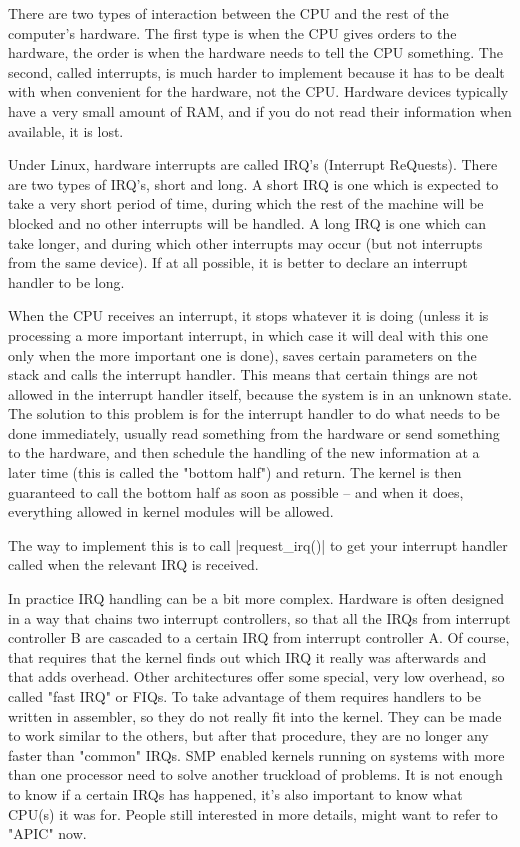 \documentclass[10pt, oneside]{book}
\begin{document}
There are two types of interaction between the CPU and the rest of the computer's hardware.
The first type is when the CPU gives orders to the hardware, the order is when the hardware needs to tell the CPU something.
The second, called interrupts, is much harder to implement because it has to be dealt with when convenient for the hardware, not the CPU.
Hardware devices typically have a very small amount of RAM, and if you do not read their information when available, it is lost.

Under Linux, hardware interrupts are called IRQ's (Interrupt ReQuests).
There are two types of IRQ's, short and long.
A short IRQ is one which is expected to take a very short period of time, during which the rest of the machine will be blocked and no other interrupts will be handled.
A long IRQ is one which can take longer, and during which other interrupts may occur (but not interrupts from the same device).
If at all possible, it is better to declare an interrupt handler to be long.

When the CPU receives an interrupt, it stops whatever it is doing (unless it is processing a more important interrupt, in which case it will deal with this one only when the more important one is done),
saves certain parameters on the stack and calls the interrupt handler.
This means that certain things are not allowed in the interrupt handler itself, because the system is in an unknown state.
The solution to this problem is for the interrupt handler to do what needs to be done immediately, usually read something from the hardware or send something to the hardware, and then schedule the handling of the new information at a later time (this is called the "bottom half") and return.
The kernel is then guaranteed to call the bottom half as soon as possible -- and when it does, everything allowed in kernel modules will be allowed.

The way to implement this is to call \cpp|request_irq()| to get your interrupt handler called when the relevant IRQ is received.

In practice IRQ handling can be a bit more complex.
Hardware is often designed in a way that chains two interrupt controllers, so that all the IRQs from interrupt controller B are cascaded to a certain IRQ from interrupt controller A.
Of course, that requires that the kernel finds out which IRQ it really was afterwards and that adds overhead. Other architectures offer some special, very low overhead, so called "fast IRQ" or FIQs.
To take advantage of them requires handlers to be written in assembler, so they do not really fit into the kernel.
They can be made to work similar to the others, but after that procedure, they are no longer any faster than "common" IRQs.
SMP enabled kernels running on systems with more than one processor need to solve another truckload of problems.
It is not enough to know if a certain IRQs has happened, it's also important to know what CPU(s) it was for.
People still interested in more details, might want to refer to "APIC" now.
\end{document}

